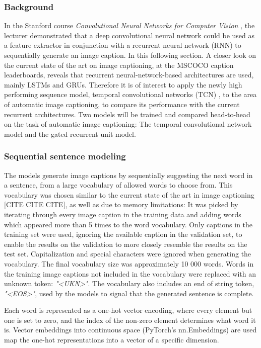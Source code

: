 \documentclass[a4paper, twoside]{article}
\begin{document}
\subsubsection{Background}
In the Stanford course \textit{Convolutional Neural Networks for Computer Vision} \cite{cs231n}, the lecturer demonstrated that a deep convolutional neural network could be used as a feature extractor in conjunction with a recurrent neural network (RNN) to sequentially generate an image caption. In this following section. A closer look on the current state of the art on image captioning, at the MSCOCO caption leaderboards, reveals that recurrent neural-network-based architectures are used, mainly LSTMs and GRUs. Therefore it is of interest to apply the newly high performing sequence model, temporal convolutional networks (TCN) \cite{tcn}, to the area of automatic image captioning, to compare its performance with the current recurrent architectures. Two models will be trained and compared head-to-head on the task of automatic image captioning: The temporal convolutional network model and the gated recurrent unit model.

\subsubsection{Sequential sentence modeling}
The models generate image captions by sequentially suggesting the next word in a sentence, from a large vocabulary of allowed words to choose from. This vocabulary was chosen similar to the current state of the art in image captioning [CITE CITE CITE], as well as due to memory limitations: It was picked by iterating through every image caption in the training data and adding words which appeared more than 5 times to the word vocabulary. Only captions in the training set were used, ignoring the available caption in the validation set, to enable the results on the validation to more closely resemble the results on the test set. Capitalization and special characters were ignored when generating the vocabulary. The final vocabulary size was approximately 10 000 words. Words in the training image captions not included in the vocabulary were replaced with an unknown token: \textit{"<UKN>"}. The vocabulary also includes an end of string token, \textit{"<EOS>"}, used by the models to signal that the generated sentence is complete.

Each word is represented as a one-hot vector encoding, where every element but one is set to zero, and the index of the non-zero element determines what word it is. Vector embeddings into continuous space (PyTorch's nn.Embeddings) \cite{pytorch} are used map the one-hot representations into a vector of a specific dimension.
\end{document}
